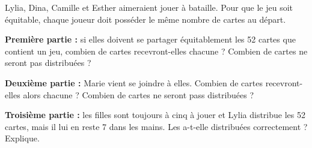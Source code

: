 %
%
Lylia, Dina, Camille et Esther aimeraient jouer à bataille. Pour que le jeu soit équitable, chaque joueur doit posséder le même nombre de cartes au départ.
    \begin{tasks}
        \task \textbf{Première partie :} si elles doivent se partager équitablement les 52 cartes que contient un jeu, combien de cartes recevront-elles chacune ? Combien de cartes ne seront pas distribuées ?

        \task \textbf{Deuxième partie :} Marie vient se joindre à elles. Combien de cartes recevront-elles alors chacune ? Combien de cartes ne seront pass distribuées ?

        \task \textbf{Troisième partie :} les filles sont toujours à cinq à jouer et Lylia distribue les 52 cartes, mais il lui en reste 7 dans les mains. Les a-t-elle distribuées correctement ? Explique.

    \end{tasks}

